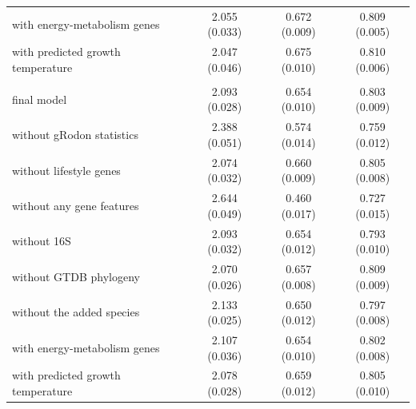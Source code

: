 \begin{table}[ht]
\begin{tabular}{lccc}
\quad with energy-metabolism genes & 2.055 (0.033) & 0.672 (0.009) & 0.809 (0.005) \\
\quad with predicted growth temperature & 2.047 (0.046) & 0.675 (0.010) & 0.810 (0.006) \\
\addlinespace
\multicolumn{4}{l}{\textit{Order held out}} \\
\quad final model & 2.093 (0.028) & 0.654 (0.010) & 0.803 (0.009) \\
\quad without gRodon statistics & 2.388 (0.051) & 0.574 (0.014) & 0.759 (0.012) \\
\quad without lifestyle genes & 2.074 (0.032) & 0.660 (0.009) & 0.805 (0.008) \\
\quad without any gene features & 2.644 (0.049) & 0.460 (0.017) & 0.727 (0.015) \\
\quad without 16S & 2.093 (0.032) & 0.654 (0.012) & 0.793 (0.010) \\
\quad without GTDB phylogeny & 2.070 (0.026) & 0.657 (0.008) & 0.809 (0.009) \\
\quad without the added species & 2.133 (0.025) & 0.650 (0.012) & 0.797 (0.008) \\
\quad with energy-metabolism genes & 2.107 (0.036) & 0.654 (0.010) & 0.802 (0.008) \\
\quad with predicted growth temperature & 2.078 (0.028) & 0.659 (0.012) & 0.805 (0.010) \\
\bottomrule
\end{tabular}
\end{table}
